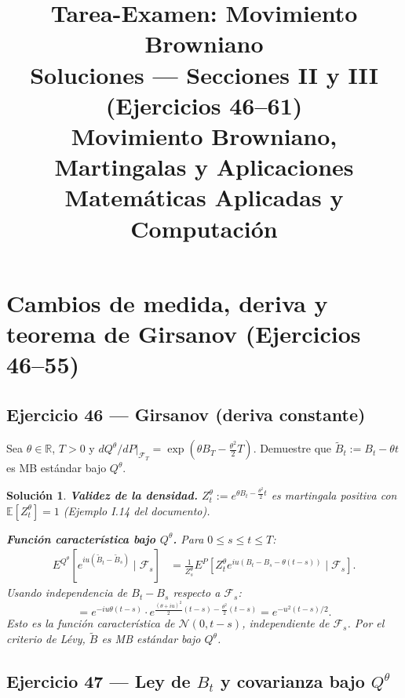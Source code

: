 \documentclass[12pt,letterpaper]{article}
\title{%
  \textbf{Tarea-Examen: Movimiento Browniano}\\[4pt]
  \large Soluciones — Secciones II y III (Ejercicios 46–61)\\
  \normalsize Movimiento Browniano, Martingalas y Aplicaciones\\
  Matemáticas Aplicadas y Computación
}
\author{}
\date{}
\theoremstyle{ejercicio}
\theoremstyle{solucion}
\newtheorem*{solucion}{Solución}
\newcommand{\E}{\mathbb{E}}
\newcommand{\R}{\mathbb{R}}
\newcommand{\F}{\mathcal{F}}
\begin{document}
\maketitle






\section{Cambios de medida, deriva y teorema de Girsanov (Ejercicios 46--55)}

\subsection*{Ejercicio 46 — Girsanov (deriva constante)}

\begin{recuadro}
Sea $\theta\in\R$, $T>0$ y $dQ^\theta/dP|_{\F_T}=\exp(\theta B_T-\frac{\theta^2}{2}T)$.
Demuestre que $\tilde B_t:=B_t-\theta t$ es MB estándar bajo $Q^\theta$.
\end{recuadro}

\begin{solucion}
\textbf{Validez de la densidad.} $Z_t^\theta:=e^{\theta B_t-\frac{\theta^2}{2}t}$ es martingala
positiva con $\E[Z_t^\theta]=1$ (Ejemplo I.14 del documento).

\textbf{Función característica bajo $Q^\theta$.} Para $0\le s\le t\le T$:
\begin{align*}
  E^{Q^\theta}[e^{iu(\tilde B_t-\tilde B_s)}\mid\F_s]
  &=\frac{1}{Z_s^\theta}E^P\!\left[Z_t^\theta e^{iu(B_t-B_s-\theta(t-s))}\mid\F_s\right].
\end{align*}
Usando independencia de $B_t-B_s$ respecto a $\F_s$:
\[
  =e^{-iu\theta(t-s)}\cdot e^{\frac{(\theta+iu)^2}{2}(t-s)-\frac{\theta^2}{2}(t-s)}
  =e^{-u^2(t-s)/2}.
\]
Esto es la función característica de $\mathcal{N}(0,t-s)$, independiente de $\F_s$.
Por el criterio de Lévy, $\tilde B$ es MB estándar bajo $Q^\theta$.
\end{solucion}

\subsection*{Ejercicio 47 — Ley de $B_t$ y covarianza bajo $Q^\theta$}
\end{document}
